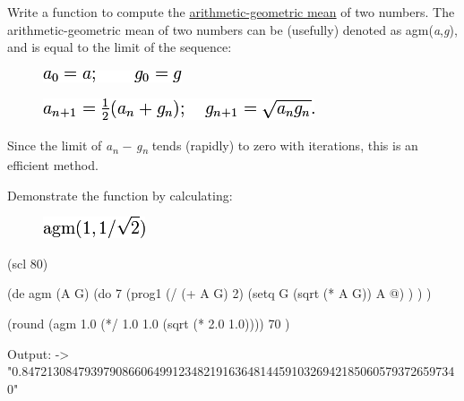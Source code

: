 Write a function to compute the
\href{http://en.wikipedia.org/wiki/Arithmetic-geometric\_mean}{arithmetic-geometric
  mean} of two numbers. The arithmetic-geometric mean of two numbers
can be (usefully) denoted as agm(\emph{a},\emph{g}), and is equal to
the limit of the sequence:

\begin{figure}[htbp]
\centering
\includegraphics[scale=.6]{graphics/da869c8260ae3107ca34619fd2642642.png}
\end{figure}
\usepackage{ctable}

\begin{figure}[htbp]
\centering
\includegraphics[scale=.6]{graphics/7416c556a1ecfe80d64f32dbc9c18ae6.png}
\end{figure}

Since the limit of \emph{a}\textsubscript{\emph{n}} −
\emph{g}\textsubscript{\emph{n}} tends (rapidly) to zero with
iterations, this is an efficient method.

Demonstrate the function by calculating:

\begin{figure}[htbp]
\centering
\includegraphics[scale=.6]{graphics/953f4c8f564b5ed18e1b31d2716b5f8c.png}
\end{figure}



\begin{wideverbatim}

(scl 80)

(de agm (A G)
   (do 7
      (prog1 (/ (+ A G) 2)
         (setq G (sqrt (* A G))  A @) ) ) )

(round
   (agm 1.0 (*/ 1.0 1.0 (sqrt (* 2.0 1.0))))
   70 )

Output:
-> "0.8472130847939790866064991234821916364814459103269421850605793726597340"

\end{wideverbatim}

